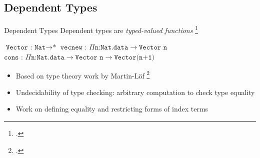 \documentclass[aspectratio=169]{beamer}
\begin{document}


\subsection{Dependent Types}

\begin{frame}{Dependent Types}
    Dependent types are \emph{typed-valued functions} \footcite{pierce_advanced_2005}
\pause
\begin{center}
   $\texttt{Vector : Nat}\rightarrow\texttt{*}$
   \pause
   $\texttt{vecnew : }\Pi\texttt{n:Nat.data}\rightarrow\texttt{Vector n}$
    \pause
   $\texttt{cons : }\Pi\texttt{n:Nat.data}\rightarrow\texttt{Vector n}\rightarrow\texttt{Vector(n+1)}$
\end{center}
    \pause
    \begin{itemize}
        \item Based on type theory work by Martin-L{\"o}f \footcite{martin-lof_constructive_1984}
        \item Undecidability of type checking: arbitrary computation to check type equality
        \item Work on defining equality and restricting forms of index terms
    \end{itemize}
\end{frame}
\end{document}
